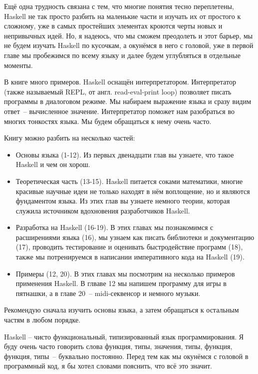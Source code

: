 Ещё одна трудность связана с тем, что многие понятия
тесно переплетены, Haskell не так просто разбить на 
маленькие части и изучать их от простого к сложному,
уже в самых простейших элементах кроются черты 
новых и непривычных идей. Но, я надеюсь, что мы сможем 
преодолеть и этот барьер, мы не будем изучать Haskell
по кусочкам, а окунёмся в него с головой, уже в первой
главе мы пробежимся по всему языку и далее будем
углубляться в отдельные моменты. 

В книге много примеров. Haskell оснащён интерпретатором.
Интерпретатор (также называемый REPL, от англ. read-eval-print loop)
позволяет писать программы в диалоговом режиме. 
Мы набираем выражение языка и сразу видим 
ответ~-- вычисленное значение. Интерпретатор поможет нам
разобраться во многих тонкостях языка. Мы будем обращаться к 
нему очень часто.

Книгу можно разбить на несколько частей:

\begin{itemize}
\item Основы языка (1-12). Из первых двенадцати глав вы узнаете,
что такое Haskell и чем он хорош. 

\item Теоретическая часть (13-15). Haskell питается соками математики,
многие красивые научные идеи не только находят в нём воплощение, 
но и являются фундаментом языка. Из этих глав вы узнаете немного
теории, которая служила источником вдохновения разработчиков Haskell.

\item Разработка на Haskell (16-19). В этих главах 
мы познакомимся с расширениями языка (16), 
мы узнаем как писать библиотеки
и документацию (17), проводить тестирование и оценивать 
быстродействие программ (18), также мы потренируемся в 
написании императивного кода на Haskell (19).

\item Примеры (12, 20). В этих главах мы посмотрим
на несколько примеров применения Haskell. В глваве 12
мы напишем программу для игры в пятнашки, а в главе
20~-- midi-секвенсор и немного музыки.

\end{itemize}

Рекомендую сначала изучить основы языка, а затем обращаться к 
остальным частям в любом порядке. 


Haskell -- чисто функциональный, типизированный язык программирования.
Я  буду очень часто говорить слова функция, типы, значения, типы, функция,
функция, типы~-- буквально постоянно. Перед тем как мы окунёмся с 
головой в программный код, я бы хотел словами пояснить, что всё это
значит. 

